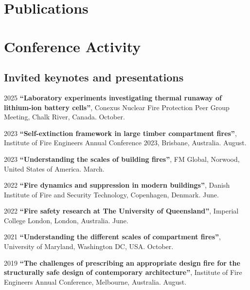 \documentclass[12pt,letterpaper]{report}
\begin{document}
    \section*{Publications}

	\nocite{*}    


    	

    \section*{Conference Activity}

    \subsection*{Invited keynotes and presentations}
	
	\begin{tablist}

    \item[2025] \tab \textbf{\enquote{Laboratory experiments investigating thermal runaway of lithium-ion battery cells}}, Conexus Nuclear Fire Protection Peer Group Meeting, Chalk River, Canada. October. 

    \item[2023] \tab \textbf{\enquote{Self-extinction framework in large timber compartment fires}}, Institute of Fire Engineers Annual Conference 2023, Brisbane, Australia. August. 

    \item[2023] \tab \textbf{\enquote{Understanding the scales of building fires}}, FM Global, Norwood, United States of America. March. 
 
	\item[2022] \tab \textbf{\enquote{Fire dynamics and suppression in modern buildings}}, Danish Institute of Fire and Security Technology, Copenhagen, Denmark. June. 
	
	\item[2022] \tab \textbf{\enquote{Fire safety research at The University of Queensland}}, Imperial College London, London, Australia. June. 
 
	\item[2021] \tab \textbf{\enquote{Understanding the different scales of compartment fires}}, University of Maryland, Washington DC, USA. October. 

    \item[2019] \tab \textbf{\enquote{The challenges of prescribing an appropriate design fire for the structurally safe design of contemporary architecture}}, Institute of Fire Engineers Annual Conference, Melbourne, Australia. August.
	
	\end{tablist}
    
\end{document}
